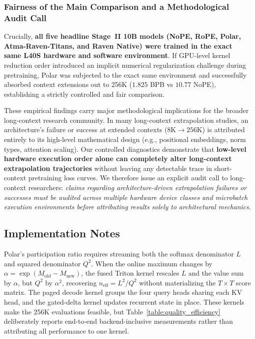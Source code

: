 \documentclass{article} %
\begin{document}
\subsubsection{Fairness of the Main Comparison and a Methodological Audit Call}
Crucially, \textbf{all five headline Stage~II 10B models (NoPE, RoPE, Polar, Atma-Raven-Titans, and Raven Native) were trained in the exact same L40S hardware and software environment}. If GPU-level kernel reduction order introduced an implicit numerical regularization challenge during pretraining, Polar was subjected to the exact same environment and successfully absorbed context extensions out to 256K ($1.825$ BPB vs $10.77$ NoPE), establishing a strictly controlled and fair comparison.

These empirical findings carry major methodological implications for the broader long-context research community. In many long-context extrapolation studies, an architecture's failure or success at extended contexts ($8\text{K} \to 256\text{K}$) is attributed entirely to its high-level mathematical design (e.g., positional embeddings, norm types, attention scaling). Our controlled diagnostics demonstrate that \textbf{low-level hardware execution order alone can completely alter long-context extrapolation trajectories} without leaving any detectable trace in short-context pretraining loss curves. We therefore issue an explicit audit call to long-context researchers: \textit{claims regarding architecture-driven extrapolation failures or successes must be audited across multiple hardware device classes and microbatch execution environments before attributing results solely to architectural mechanics.}

\FloatBarrier
\subsection{Implementation Notes}
Polar's participation ratio requires streaming both the softmax denominator $L$ and squared denominator $Q^2$. When the online maximum changes by $\alpha=\exp(M_{\mathrm{old}}-M_{\mathrm{new}})$, the fused Triton kernel rescales $L$ and the value sum by $\alpha$, but $Q^2$ by $\alpha^2$, recovering $n_{\mathrm{eff}}=L^2/Q^2$ without materializing the $T\times T$ score matrix. The paged decode kernel groups the four query heads sharing each KV head, and the gated-delta kernel updates recurrent state in place. These kernels make the 256K evaluations feasible, but Table~\ref{table:quality_efficiency} deliberately reports end-to-end backend-inclusive measurements rather than attributing all performance to one kernel.
\end{document}
